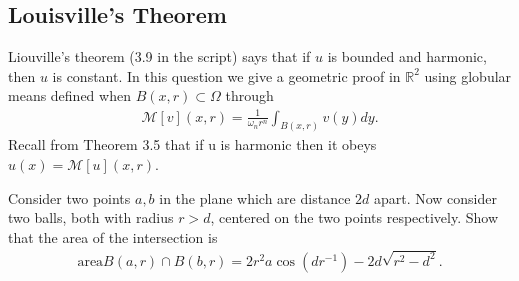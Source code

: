 \subsection*{Louisville's Theorem}
Liouville’s theorem (3.9 in the script) says that if $u$ is bounded and harmonic, then $u$ is constant.
In this question we give a geometric proof in $\mathbb{R}^{2} $ using globular means defined when $B(x, r) \subset  \Omega $
through
\begin{align*}
  \mathcal{M}[v](x,r) = \frac{1}{\omega_nr^{n} } \int_{B(x,r)}v(y) dy
.\end{align*}
Recall from Theorem 3.5 that if u is harmonic then it obeys $u(x) = \mathcal{M}[u](x, r)$.
\begin{exercise}[a]
Consider two points $a,b$ in the plane which are distance $2d$ apart. Now consider two balls,
both with radius $r>d$, centered on the two points respectively. Show that the area of the intersection is 
\begin{align*}
  \text{area} B(a,r) \cap B(b,r) = 2r^2 a\cos(dr^{-1} ) - 2d\sqrt{r^2-d^2} 
.\end{align*}
\end{exercise}
